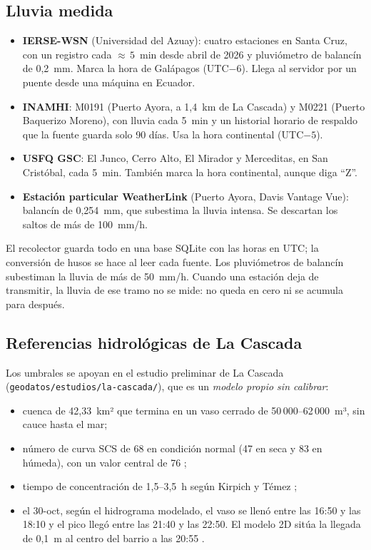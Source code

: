 \documentclass{sosg-informe}
\begin{document}
\subsection{Lluvia medida}
\begin{itemize}
  \item \textbf{IERSE-WSN} (Universidad del Azuay): cuatro estaciones en Santa Cruz, con un registro cada ${\approx}\,5$~min desde abril de 2026 y pluviómetro de balancín de 0,2~mm. Marca la hora de Galápagos (UTC$-6$). Llega al servidor por un puente desde una máquina en Ecuador.
  \item \textbf{INAMHI}: M0191 (Puerto Ayora, a 1,4~km de La Cascada) y M0221 (Puerto Baquerizo Moreno), con lluvia cada 5~min y un historial horario de respaldo que la fuente guarda solo 90 días. Usa la hora continental (UTC$-5$).
  \item \textbf{USFQ GSC}: El Junco, Cerro Alto, El Mirador y Merceditas, en San Cristóbal, cada 5~min. También marca la hora continental, aunque diga \enquote{Z}.
  \item \textbf{Estación particular WeatherLink} (Puerto Ayora, Davis Vantage Vue): balancín de 0,254~mm, que subestima la lluvia intensa. Se descartan los saltos de más de 100~mm/h.
\end{itemize}
El recolector guarda todo en una base SQLite con las horas en UTC; la conversión de husos se hace al leer cada fuente. Los pluviómetros de balancín subestiman la lluvia de más de 50~mm/h. Cuando una estación deja de transmitir, la lluvia de ese tramo no se mide: no queda en cero ni se acumula para después.

\subsection{Referencias hidrológicas de La Cascada}
Los umbrales se apoyan en el estudio preliminar de La Cascada (\texttt{geodatos/estudios/la-cascada/}), que es un \emph{modelo propio sin calibrar}:
\begin{itemize}
  \item cuenca de 42,33~km² que termina en un vaso cerrado de 50\,000--62\,000~m³, sin cauce hasta el mar;
  \item número de curva SCS de 68 en condición normal (47 en seca y 83 en húmeda), con un valor central de 76 \citep{mishra2003};
  \item tiempo de concentración de 1,5--3,5~h según Kirpich y Témez \citep{kirpich1940,temez1978};
  \item el 30-oct, según el hidrograma modelado, el vaso se llenó entre las 16:50 y las 18:10 y el pico llegó entre las 21:40 y las 22:50. El modelo 2D sitúa la llegada de 0,1~m al centro del barrio a las 20:55 \citep{maya2026idf}.
\end{itemize}
\end{document}
